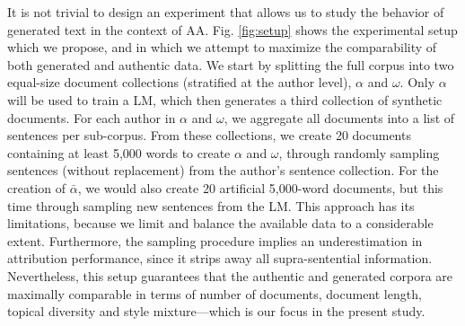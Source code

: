 \documentclass[11pt]{article}
\begin{document}
It is not trivial to design an experiment that allows us to study the behavior
of generated text in the context of AA. Fig. \ref{fig:setup} shows the experimental setup which we propose, and in which we attempt to maximize the
comparability of both generated and authentic data. We start by splitting the full
corpus into two equal-size document collections (stratified at the author level), $\alpha$ and $\omega$.
Only $\alpha$ will be used to train a LM, which then generates a third collection of synthetic documents.
For each author in $\alpha$
and $\omega$, we aggregate all documents into a list of sentences per sub-corpus. From these collections, we create 20 documents containing at least 5,000 words to create $\alpha$ and $\omega$, through randomly sampling sentences (without replacement) from the author's sentence collection. For the creation of $\bar{\alpha}$, we would also create 20 artificial 5,000-word documents, but this time through sampling new sentences from the LM. This approach has its limitations, because we limit and balance the available data to a considerable extent. Furthermore, the sampling procedure implies an underestimation in attribution performance, since it strips away all supra-sentential information.
Nevertheless, this setup guarantees that the authentic and 
generated corpora are maximally comparable in terms of number of documents, document length, topical diversity and style mixture---which is our focus in the present study.
\end{document}
